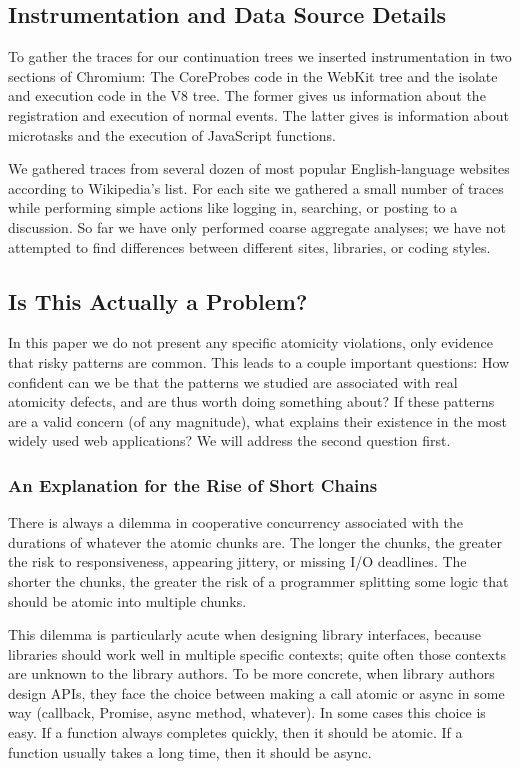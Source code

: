 \documentclass[acmsmall,anonymous,review]{acmart}\settopmatter{printfolios=true,printccs=false,printacmref=false}
\begin{document}
\subsection{Instrumentation and Data Source Details}

To gather the traces for our continuation trees we inserted instrumentation in two sections of Chromium: The CoreProbes code in the WebKit tree and the isolate and execution code in the V8 tree.
The former gives us information about the registration and execution of normal events.
The latter gives is information about microtasks and the execution of JavaScript functions.

We gathered traces from several dozen of most popular English-language websites according to Wikipedia's list.
For each site we gathered a small number of traces while performing simple actions like logging in, searching, or posting to a discussion.
So far we have only performed coarse aggregate analyses; we have not attempted to find differences between different sites, libraries, or coding styles.

\subsection{Is This Actually a Problem?}

In this paper we do not present any specific atomicity violations, only evidence that risky patterns are common.
This leads to a couple important questions:
How confident can we be that the patterns we studied are associated with real atomicity defects, and are thus worth doing something about?
If these patterns are a valid concern (of any magnitude), what explains their existence in the most widely used web applications?
We will address the second question first.

\subsubsection{An Explanation for the Rise of Short Chains}

There is always a dilemma in cooperative concurrency associated with the durations of whatever the atomic chunks are.
The longer the chunks, the greater the risk to responsiveness, appearing jittery, or missing I/O deadlines.
The shorter the chunks, the greater the risk of a programmer splitting some logic that should be atomic into multiple chunks.

This dilemma is particularly acute when designing library interfaces, because libraries should work well in multiple specific contexts; quite often those contexts are unknown to the library authors.
To be more concrete, when library authors design APIs, they face the choice between making a call atomic or async in some way (callback, Promise, async method, whatever).
In some cases this choice is easy.
If a function always completes quickly, then it should be atomic.
If a function usually takes a long time, then it should be async.
\end{document}
